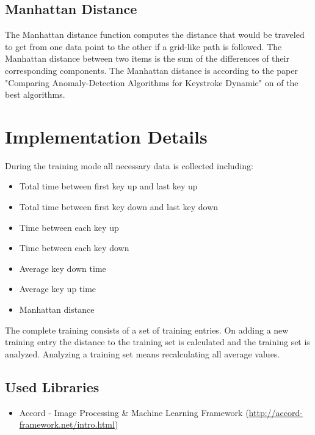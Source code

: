 \documentclass[fleqn,10pt]{SelfArx} %
\begin{document}
\subsection{Manhattan Distance}
The Manhattan distance function computes the distance that would be traveled to get from one data point to the other if a grid-like path is followed. The Manhattan distance between two items is the sum of the differences of their corresponding components\cite{manhattan}.
\newline
The Manhattan distance is according to the paper "Comparing Anomaly-Detection Algorithms for Keystroke Dynamic" \cite{Figueredo:2009dg} on of the best algorithms. 

\section{Implementation Details}
During the training mode all necessary data is collected including:
\begin{itemize}
  \item Total time between first key up and last key up
  \item Total time between first key down and last key down
  \item Time between each key up
  \item Time between each key down
  \item Average key down time
  \item Average key up time
  \item Manhattan distance
\end{itemize}
The complete training consists of a set of training entries. On adding a new training entry the distance to the training set is calculated and the training set is analyzed. Analyzing a training set means recalculating all average values.

\subsection{Used Libraries}
\begin{itemize}
  \item Accord - Image Processing \& Machine Learning Framework (\url{http://accord-framework.net/intro.html})
\end{itemize}
\end{document}
